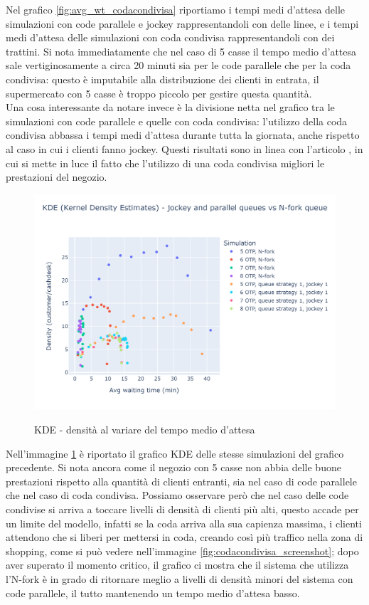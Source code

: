 Nel grafico \ref{fig:avg_wt_codacondivisa} riportiamo i tempi medi d'attesa delle simulazioni con code parallele e jockey rappresentandoli con delle linee, e i tempi medi d'attesa delle simulazioni con coda condivisa rappresentandoli con dei trattini. Si nota immediatamente che nel caso di 5 casse il tempo medio d'attesa sale vertiginosamente a circa 20 minuti sia per le code parallele che per la coda condivisa: questo è imputabile alla distribuzione dei clienti in entrata, il supermercato con 5 casse è troppo piccolo per gestire questa quantità. \\
Una cosa interessante da notare invece è la divisione netta nel grafico tra le simulazioni con code parallele e quelle con coda condivisa: l'utilizzo della coda condivisa abbassa i tempi medi d'attesa durante tutta la giornata, anche rispetto al caso in cui i clienti fanno jockey. Questi risultati sono in linea con l'articolo \cite{yanagisawa2011methods}, in cui si mette in luce il fatto che l'utilizzo di una coda condivisa migliori le prestazioni del negozio.

\begin{figure}[H]
	\centering
	\includegraphics[width=12cm]{"images/results/kde_codacondivisa.png"}
	\label{fig:kde_codacondivisa}
	\caption{KDE - densità al variare del tempo medio d'attesa}
\end{figure}

Nell'immagine \ref{fig:kde_codacondivisa} è riportato il grafico KDE delle stesse simulazioni del grafico precedente. Si nota ancora come il negozio con 5 casse non abbia delle buone prestazioni rispetto alla quantità di clienti entranti, sia nel caso di code parallele che nel caso di coda condivisa. Possiamo osservare però che nel caso delle code condivise si arriva a toccare livelli di densità di clienti più alti, questo accade per un limite del modello, infatti se la coda arriva alla sua capienza massima, i clienti attendono che si liberi per mettersi in coda, creando così più traffico nella zona di shopping, come si può vedere nell'immagine \ref{fig:codacondivisa_screenshot}; dopo aver superato il momento critico, il grafico ci mostra che il sistema che utilizza l'N-fork è in grado di ritornare meglio a livelli di densità minori del sistema con code parallele, il tutto mantenendo un tempo medio d'attesa basso.


